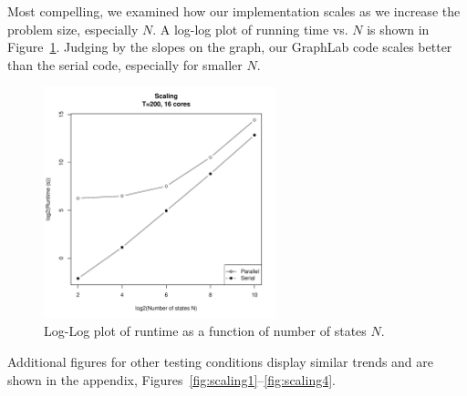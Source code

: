 Most compelling, we examined how our implementation scales as we increase the
problem size, especially $N$. A log-log plot of running time vs. $N$ is shown in
Figure~\ref{fig:scaling-16-200}. Judging by the slopes on the graph, our
GraphLab code scales better than the serial code, especially for smaller $N$. 

\begin{figure}[htb]
    \centering
    \includegraphics[width=0.6\textwidth]{../figure/scaling-cores_16-T_200.pdf}
    \caption{Log-Log plot of runtime as a function of number of states $N$.}
    \label{fig:scaling-16-200}
\end{figure}

Additional figures for other testing conditions display similar trends and are
shown in the appendix, Figures~\ref{fig:scaling1}--\ref{fig:scaling4}. 

